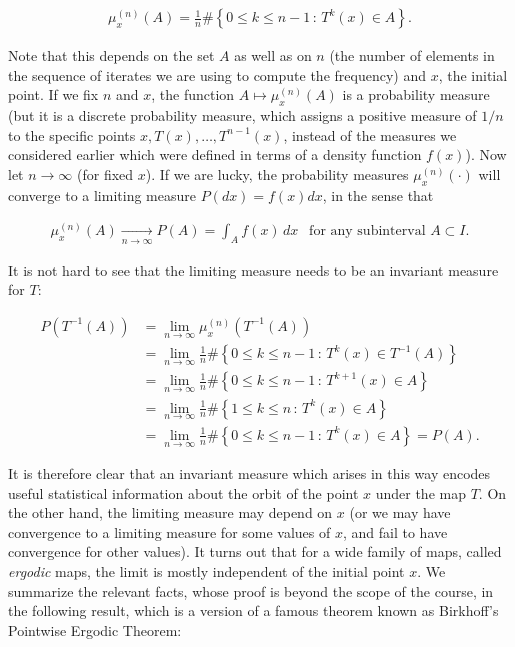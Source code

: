\documentclass[11pt]{report}
\theoremstyle{plain}
\theoremstyle{definition}
\begin{document}
\begin{align*}
\mu_{x}^{(n)}(A) = \frac{1}{n} \# \left\{ 0\le k \le n-1\,:\, T^k(x) \in A \right\}.
\end{align*}

Note that this depends on the set $A$ as well as on
$n$ (the number of elements in the sequence of
iterates we are using to compute the frequency) and
$x$, the initial point. If we fix $n$ and $x$, the
function $A\mapsto \mu_x^{(n)}(A)$ is a probability
measure (but it is a discrete probability measure,
which assigns a positive measure of $1/n$ to the
specific points $x,T(x),\ldots,T^{n-1}(x)$, instead
of the measures we considered earlier which were
defined in terms of a density function $f(x)$). Now
let $n\to\infty$ (for fixed $x$). If we are lucky,
the probability measures $\mu_x^{(n)}(\cdot)$ will
converge to a limiting measure $P(dx)=f(x)dx$, in the
sense that

\begin{align*}
\mu_x^{(n)}(A) \xrightarrow[n\to\infty]{} P(A) = \int_A f(x)\,dx \ \ \textrm{ for any subinterval }A\subset I.
\end{align*}

It is not hard to see that the limiting measure needs
to be an invariant measure for $T$:

\begin{align*}
P(T^{-1}(A)) &= \lim_{n\to\infty} \mu_x^{(n)}(T^{-1}(A)) \\ &
= \lim_{n\to\infty} \frac{1}{n}\#\left\{ 0\le k\le n-1\,:\,T^k(x)\in T^{-1}(A) \right\} \\
&
= \lim_{n\to\infty} \frac{1}{n}\#\left\{ 0\le k\le n-1\,:\,T^{k+1}(x)\in A \right\} \\
&
= \lim_{n\to\infty} \frac{1}{n}\#\left\{ 1\le k\le n\,:\,T^{k}(x)\in A \right\} \\
&
= \lim_{n\to\infty} \frac{1}{n}\#\left\{ 0\le k\le n-1\,:\,T^{k}(x)\in A \right\} = P(A).
\end{align*}

It is therefore clear that an invariant measure which
arises in this way encodes useful statistical
information about the orbit of the point $x$ under
the map $T$. On the other hand, the limiting measure
may depend on $x$ (or we may have convergence to a
limiting measure for some values of $x$, and fail to
have convergence for other values). It turns out that
for a wide family of maps, called \emph{ergodic} maps, the
limit is mostly independent of the initial point $x$.
We summarize the relevant facts, whose proof is beyond
the scope of the course, in the following result,
which is a version of a famous theorem known as
Birkhoff's Pointwise Ergodic Theorem:
\end{document}

